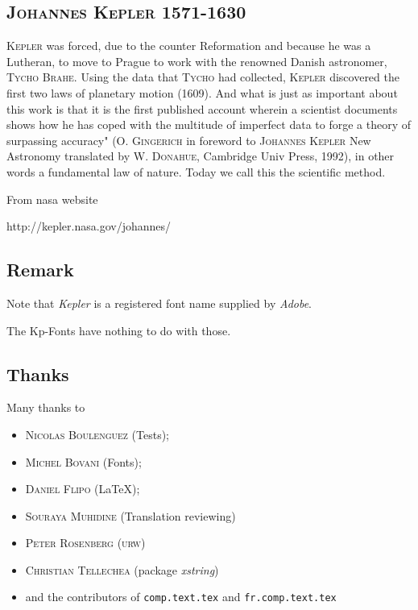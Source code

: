 \documentclass[a4paper,11pt]{christophe}
\begin{document}
\subsection{\textsc{Johannes Kepler 1571-1630}}

    \textsc{Kepler} was forced, due to the counter Reformation and because he was a Lutheran, to move to Prague to work with the renowned Danish astronomer, \textsc{Tycho Brahe}. Using the data that \textsc{Tycho} had collected, \textsc{Kepler} discovered the first two laws of planetary motion (1609). And what is just as important about this work is that it is the first published account wherein a scientist documents shows how he has coped with the multitude of imperfect data to forge a theory of surpassing accuracy" (\textsc{O. Gingerich} in foreword to \textsc{Johannes Kepler} New Astronomy translated by \textsc{W. Donahue}, Cambridge Univ Press, 1992), in other words a fundamental law of nature. Today we call this the scientific method.

From nasa website

http://kepler.nasa.gov/johannes/

\subsection{Remark}

Note that \textit{Kepler}\textregistered{} is a registered font name supplied by \textit{Adobe}\texttrademark. 

The Kp-Fonts have nothing to do with those.

\subsection{Thanks}

Many thanks to
\begin{itemize}
	\item \textsc{Nicolas Boulenguez} (Tests);
	\item \textsc{Michel Bovani} (Fonts);
	\item \textsc{Daniel Flipo} (\LaTeX);
	\item \textsc{Souraya Muhidine} (Translation reviewing)
	\item \textsc{Peter Rosenberg} (\textsc{urw})
	\item \textsc{Christian Tellechea} (package \textit{xstring})
	\item and the contributors of \texttt{comp.text.tex} and \texttt{fr.comp.text.tex}
	\end{itemize}
	
\end{document}

